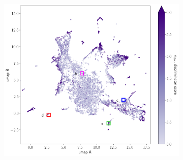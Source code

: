 \begin{figure}
\begin{subfigure}{0.68\textwidth}
  \centering
  \includegraphics[width=1\linewidth]{umap_3sigd_auto_resids_boxes.png}  
  \vspace{-2em}
  \caption{}
  \label{fig:umap_3sig_boxes}
\end{subfigure}


\end{figure}
